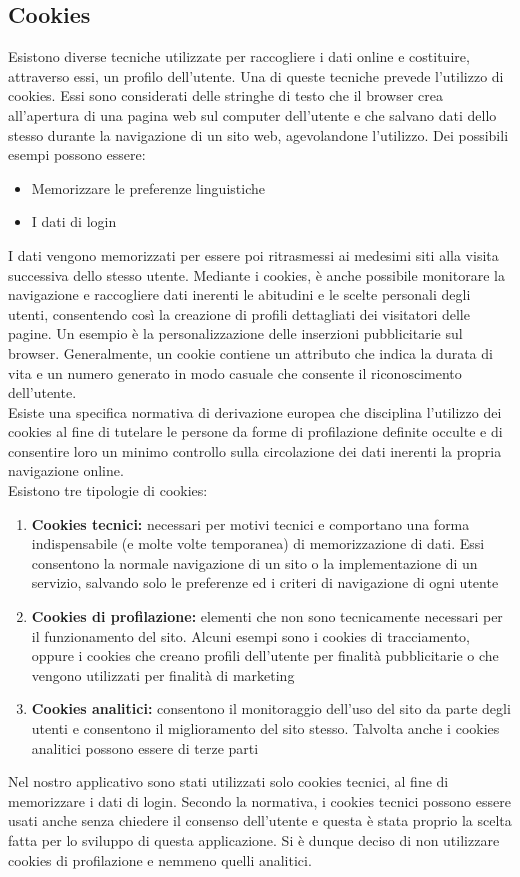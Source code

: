 \documentclass[a4paper,final,12pt]{report}
\begin{document}
\subsection{Cookies}
Esistono diverse tecniche utilizzate per raccogliere i dati online e costituire, attraverso essi, un profilo dell'utente. Una di queste tecniche prevede l'utilizzo di cookies. Essi sono considerati delle stringhe di testo che il browser crea all'apertura di una pagina web sul computer dell'utente e che salvano dati dello stesso durante la navigazione di un sito web, agevolandone l'utilizzo. Dei possibili esempi possono essere:
\begin{itemize}
\item Memorizzare le preferenze linguistiche
\item I dati di login
\end{itemize}
I dati vengono memorizzati per essere poi ritrasmessi ai medesimi siti alla visita successiva dello stesso utente. Mediante i cookies, è anche possibile monitorare la navigazione e raccogliere dati inerenti le abitudini e le scelte personali degli utenti, consentendo così la creazione di profili dettagliati dei visitatori delle pagine. Un esempio è la personalizzazione delle inserzioni pubblicitarie sul browser. Generalmente, un cookie contiene un attributo che indica la durata di vita e un numero generato in modo casuale che consente il riconoscimento dell'utente.\\
Esiste una specifica normativa di derivazione europea che disciplina l'utilizzo dei cookies al fine di tutelare le persone da forme di profilazione definite occulte e di consentire loro un minimo controllo sulla circolazione dei dati inerenti la propria navigazione online.\\
Esistono tre tipologie di cookies:
\begin{enumerate}
\item \textbf{Cookies tecnici:} necessari per motivi tecnici e comportano una forma indispensabile (e molte volte temporanea) di memorizzazione di dati. Essi consentono la normale navigazione di un sito o la implementazione di un servizio, salvando solo le preferenze ed i criteri di navigazione di ogni utente
\item \textbf{Cookies di profilazione:} elementi che non sono tecnicamente necessari per il funzionamento del sito. Alcuni esempi sono i cookies di tracciamento, oppure i cookies che creano profili dell'utente per finalità pubblicitarie o che vengono utilizzati per finalità di marketing
\item \textbf{Cookies analitici:} consentono il monitoraggio dell'uso del sito da parte degli utenti e consentono il miglioramento del sito stesso. Talvolta anche i cookies analitici possono essere di terze parti
\end{enumerate}
Nel nostro applicativo sono stati utilizzati solo cookies tecnici, al fine di memorizzare i dati di login. Secondo la normativa, i cookies tecnici possono essere usati anche senza chiedere il consenso dell'utente e questa è stata proprio la scelta fatta per lo sviluppo di questa applicazione. Si è dunque deciso di non utilizzare cookies di profilazione e nemmeno quelli analitici.
\end{document}
